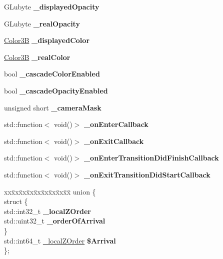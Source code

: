 \begin{DoxyCompactItemize}
G\+Lubyte {\bfseries \+\_\+displayed\+Opacity}
\item 
\mbox{\label{classNode_a8ee88e0376dada82903f9d76b4416e37}} 
G\+Lubyte {\bfseries \+\_\+real\+Opacity}
\item 
\mbox{\label{classNode_ac70a6642e280ea92d89ea31154b5148e}} 
\hyperlink{structColor3B}{Color3B} {\bfseries \+\_\+displayed\+Color}
\item 
\mbox{\label{classNode_ac937ea0e801b0643b73da4c7149ec75d}} 
\hyperlink{structColor3B}{Color3B} {\bfseries \+\_\+real\+Color}
\item 
\mbox{\label{classNode_a2e154f9f1e136347363e2fdd05a14664}} 
bool {\bfseries \+\_\+cascade\+Color\+Enabled}
\item 
\mbox{\label{classNode_aa793e94b08d5d5ad565ddd63057bf9e7}} 
bool {\bfseries \+\_\+cascade\+Opacity\+Enabled}
\item 
\mbox{\label{classNode_ad031cdf7519c89ff16e8f5891a79710c}} 
unsigned short {\bfseries \+\_\+camera\+Mask}
\item 
\mbox{\label{classNode_a83f477a7efd99e164623e7b3161051ba}} 
std\+::function$<$ void()$>$ {\bfseries \+\_\+on\+Enter\+Callback}
\item 
\mbox{\label{classNode_a9ccbce0c6022f6244c4ac0dfb2b1d1fd}} 
std\+::function$<$ void()$>$ {\bfseries \+\_\+on\+Exit\+Callback}
\item 
\mbox{\label{classNode_a5aff1ceba5b9a02bfdc73d60a19090e6}} 
std\+::function$<$ void()$>$ {\bfseries \+\_\+on\+Enter\+Transition\+Did\+Finish\+Callback}
\item 
\mbox{\label{classNode_a1d331be7013cc0b9ecd7c11d712bdad3}} 
std\+::function$<$ void()$>$ {\bfseries \+\_\+on\+Exit\+Transition\+Did\+Start\+Callback}
\item 
\mbox{\label{classNode_a96786af79481c33d1def62869d62eeee}} 
\begin{tabbing}
xx\=xx\=xx\=xx\=xx\=xx\=xx\=xx\=xx\=\kill
union \{\\
\mbox{\label{unionNode_1_1_0D204_ae24af93084da1038b3e85d6231b597e3}} 
\>struct \{\\
\>\>std::int32\_t {\bfseries \_localZOrder}\\
\>\>std::uint32\_t {\bfseries \_orderOfArrival}\\
\>\} \\
\>std::int64\_t \hyperlink{classNode_acd2322ede4846f7dec8e8202587985a9}{\_localZOrder} {\bfseries \$Arrival}\\
\}; \\


\end{tabbing}
\end{DoxyCompactItemize}
